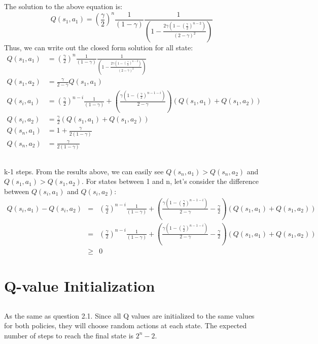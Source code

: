 \documentclass[12pt]{article}
\begin{document}
    The solution to the above equation is:
    \begin{equation}
        Q(s_1,a_1)= (\frac{\gamma}{2})^{n}\frac{1}{(1-\gamma)} \frac{1}{(1-\frac{2\gamma(1- (\frac{\gamma}{2})^{n-2})}{(2-\gamma)^2})} \nonumber
    \end{equation}
    Thus, we can write out the closed form solution for all state:
    \begin{align*}
        Q(s_1,a_1)&= (\frac{\gamma}{2})^{n}\frac{1}{(1-\gamma)} \frac{1}{(1-\frac{2\gamma(1- (\frac{\gamma}{2})^{n-2})}{(2-\gamma)^2})} \\
        Q(s_1,a_2)&= \frac{\gamma}{2-\gamma}Q(s_1, a_1)\\
        Q(s_{i}, a_1) &=  (\frac{\gamma}{2})^{n-i}\frac{1}{(1-\gamma)} + (\frac{\gamma(1- (\frac{\gamma}{2})^{n-1-i})}{2-\gamma})(Q(s_1,a_1)+Q(s_1,a_2))\\
        Q(s_{i}, a_2) &= \frac{\gamma}{2}(Q(s_1, a_1) + Q(s_1, a_2)) \\
        Q(s_n,a_1) &= 1 + \frac{\gamma}{2(1-\gamma)} \\
        Q(s_n,a_2) &= \frac{\gamma}{2(1-\gamma)}
    \end{align*}

\subsection{}
k-1 steps. From the results above, we can easily see $Q(s_n, a_1) > Q(s_n, a_2)$ and $Q(s_1, a_1) > Q(s_1, a_2)$. For states between 1 and n, let's consider the difference between $Q(s_i, a_1)$ and $Q(s_i, a_2)$:
\begin{eqnarray*}
    Q(s_{i}, a_1) - Q(s_{i}, a_2) &=& (\frac{\gamma}{2})^{n-i}\frac{1}{(1-\gamma)} + (\frac{\gamma(1- (\frac{\gamma}{2})^{n-1-i})}{2-\gamma}-\frac{\gamma}{2})(Q(s_1,a_1)+Q(s_1,a_2))\\
    &=& (\frac{\gamma}{2})^{n-i}\frac{1}{(1-\gamma)} + (\frac{\gamma(1- (\frac{\gamma}{2})^{n-1-i})}{2-\gamma}-\frac{\gamma}{2})(Q(s_1,a_1)+Q(s_1,a_2))\\
    &\ge& 0 
\end{eqnarray*}

\newpage

\section{Q-value Initialization}
\subsection{}
As the same as question 2.1. Since all Q values are initialized to the same values for both policies, they will choose random actions at each state. The expected number of steps to reach the final state is $2^n - 2$.
\end{document}
